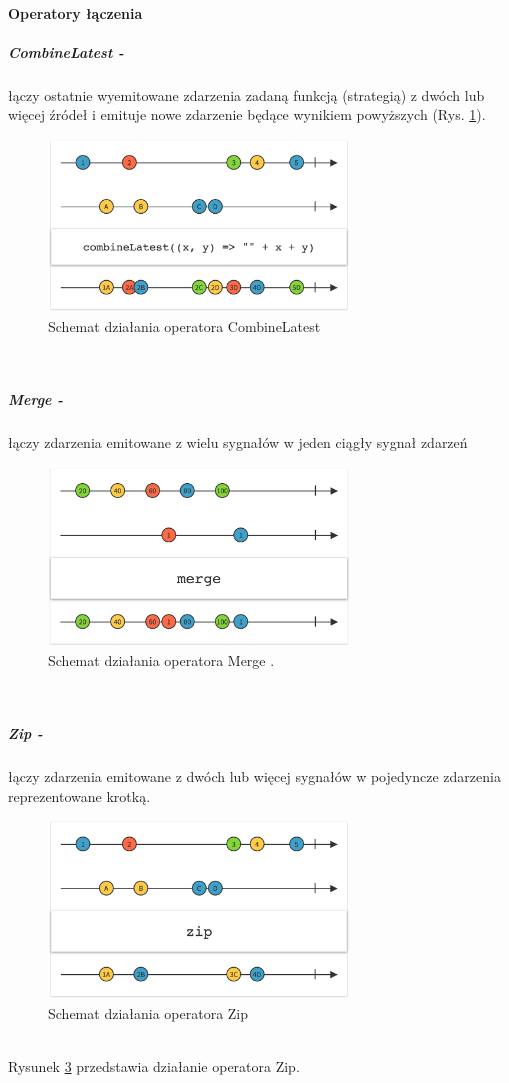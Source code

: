 \documentclass[12pt,oneside,a4paper]{report}
\begin{document}
\paragraph{Operatory łączenia}
\subparagraph{CombineLatest -}łączy ostatnie wyemitowane zdarzenia zadaną funkcją (strategią) z dwóch lub więcej źródeł i emituje nowe zdarzenie będące wynikiem powyższych (Rys. \ref{combineLatest}). 
\begin{figure}[ht!]
	\centering
	\includegraphics[width=8cm]{combinelatest}
	\caption{Schemat działania operatora CombineLatest\cite{marbles}}
	\label{combineLatest}
\end{figure}\\
\subparagraph{Merge -}łączy zdarzenia emitowane z wielu sygnałów w jeden ciągły sygnał zdarzeń
\begin{figure}[ht!]
	\centering
	\includegraphics[width=8cm]{merge}
	\caption{Schemat działania operatora Merge \cite{marbles}.}
	\label{merge}
\end{figure}\\
\subparagraph{Zip -}łączy zdarzenia emitowane z dwóch lub więcej sygnałów w pojedyncze zdarzenia reprezentowane krotką. 
\begin{figure}[ht!]
	\centering
	\includegraphics[width=8cm]{zip}
	\caption{Schemat działania operatora Zip\cite{zip}}
	\label{zip}
\end{figure}\\
Rysunek \ref{zip} przedstawia działanie operatora Zip.
\end{document}
